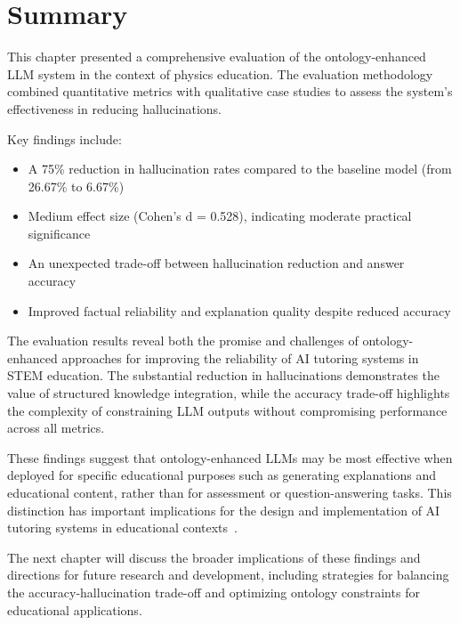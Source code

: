 \section{Summary}
\label{sec:summary}

This chapter presented a comprehensive evaluation of the ontology-enhanced LLM system in the context of physics education. The evaluation methodology combined quantitative metrics with qualitative case studies to assess the system's effectiveness in reducing hallucinations.

Key findings include:
\begin{itemize}
    \item A 75\% reduction in hallucination rates compared to the baseline model (from 26.67\% to 6.67\%)
    \item Medium effect size (Cohen's d = 0.528), indicating moderate practical significance
    \item An unexpected trade-off between hallucination reduction and answer accuracy
    \item Improved factual reliability and explanation quality despite reduced accuracy
\end{itemize}

The evaluation results reveal both the promise and challenges of ontology-enhanced approaches for improving the reliability of AI tutoring systems in STEM education. The substantial reduction in hallucinations demonstrates the value of structured knowledge integration, while the accuracy trade-off highlights the complexity of constraining LLM outputs without compromising performance across all metrics.

These findings suggest that ontology-enhanced LLMs may be most effective when deployed for specific educational purposes such as generating explanations and educational content, rather than for assessment or question-answering tasks. This distinction has important implications for the design and implementation of AI tutoring systems in educational contexts~\cite{rivera2024impact}.

The next chapter will discuss the broader implications of these findings and directions for future research and development, including strategies for balancing the accuracy-hallucination trade-off and optimizing ontology constraints for educational applications.